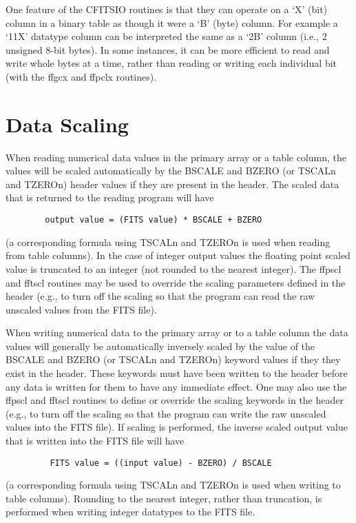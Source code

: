 One feature of the CFITSIO routines is that they can operate on
a `X' (bit) column in a binary table as though it were a `B' (byte) column.
For example a `11X' datatype column can be interpreted the same
as a `2B' column (i.e., 2 unsigned 8-bit bytes).
In some instances, it can be more efficient to read and write whole
bytes at a time, rather than reading or writing each individual bit
(with the ffgcx and ffpclx routines).


\section{Data Scaling}

When reading numerical data values in the primary array or a
table column, the values will be scaled automatically by the BSCALE and
BZERO (or TSCALn and TZEROn) header values if they are
present in the header.  The scaled data that is returned to the reading
program will have

\begin{verbatim}
        output value = (FITS value) * BSCALE + BZERO
\end{verbatim}
(a corresponding formula using TSCALn and TZEROn is used when reading
from table columns).  In the case of integer output values the floating
point scaled value is truncated to an integer (not rounded to the
nearest integer).  The ffpscl and fftscl routines may be used to
override the scaling parameters defined in the header (e.g., to turn
off the scaling so that the program can read the raw unscaled values
from the FITS file).

When writing numerical data to the primary array or to a table
column the data values will generally be automatically inversely scaled
by the value of the BSCALE and BZERO (or TSCALn and TZEROn)
keyword values if they they exist in the header.  These keywords must
have been written to the header before any data is written for them to
have any immediate effect.  One may also use the ffpscl and fftscl
routines to define or override the scaling keywords in the header
(e.g., to turn off the scaling so that the program can write the raw
unscaled values into the FITS file). If scaling is performed, the
inverse scaled output value that is written into the FITS file will
have

\begin{verbatim}
         FITS value = ((input value) - BZERO) / BSCALE
\end{verbatim}
(a corresponding formula using TSCALn and TZEROn is used when
writing to table columns).  Rounding to the nearest integer, rather
than truncation, is performed when writing integer datatypes to the
FITS file.


